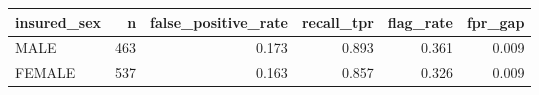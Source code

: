 \begin{tabular}{lrrrrr}
\toprule
insured_sex & n & false_positive_rate & recall_tpr & flag_rate & fpr_gap \\
\midrule
MALE & 463 & 0.173 & 0.893 & 0.361 & 0.009 \\
FEMALE & 537 & 0.163 & 0.857 & 0.326 & 0.009 \\
\bottomrule
\end{tabular}
